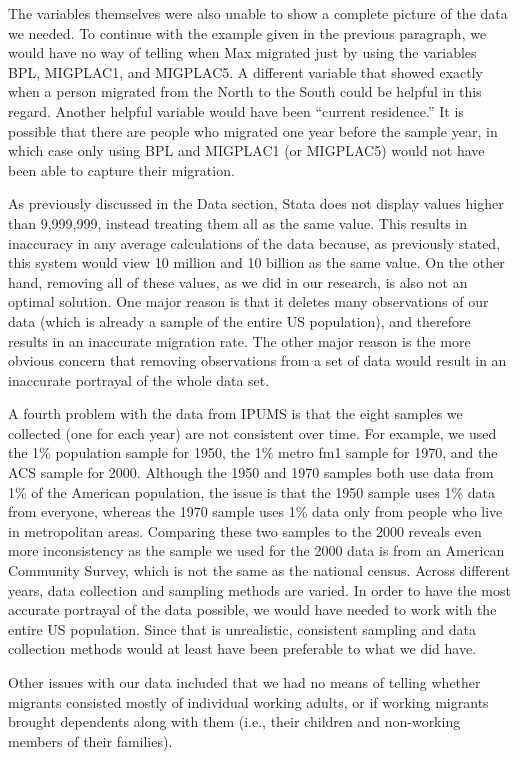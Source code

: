 \documentclass[12pt]{article}
\begin{document}
The variables themselves were also unable to show a complete picture of the data we needed. To continue with the example given in the previous paragraph, we would have no way of telling when Max migrated just by using the variables BPL, MIGPLAC1, and MIGPLAC5. A different variable that showed exactly when a person migrated from the North to the South could be helpful in this regard. Another helpful variable would have been “current residence.” It is possible that there are people who migrated one year before the sample year, in which case only using BPL and MIGPLAC1 (or MIGPLAC5) would not have been able to capture their migration. 

As previously discussed in the Data section, Stata does not display values higher than 9,999,999, instead treating them all as the same value. This results in inaccuracy in any average calculations of the data because, as previously stated, this system would view 10 million and 10 billion as the same value. On the other hand, removing all of these values, as we did in our research, is also not an optimal solution. One major reason is that it deletes many observations of our data (which is already a sample of the entire US population), and therefore results in an inaccurate migration rate. The other major reason is the more obvious concern that removing observations from a set of data would result in an inaccurate portrayal of the whole data set. 

A fourth problem with the data from IPUMS is that the eight samples we collected (one for each year) are not consistent over time. For example, we used the 1\% population sample for 1950, the 1\% metro fm1 sample for 1970, and the ACS sample for 2000. Although the 1950 and 1970 samples both use data from 1\% of the American population, the issue is that the 1950 sample uses 1\% data from everyone, whereas the 1970 sample uses 1\% data only from people who live in metropolitan areas. Comparing these two samples to the 2000 reveals even more inconsistency as the sample we used for the 2000 data is from an American Community Survey, which is not the same as the national census. Across different years, data collection and sampling methods are varied. In order to have the most accurate portrayal of the data possible, we would have needed to work with the entire US population. Since that is unrealistic, consistent sampling and data collection methods would at least have been preferable to what we did have. 

Other issues with our data included that we had no means of telling whether migrants consisted mostly of individual working adults, or if working migrants brought dependents along with them (i.e., their children and non-working members of their families). 
\end{document}
